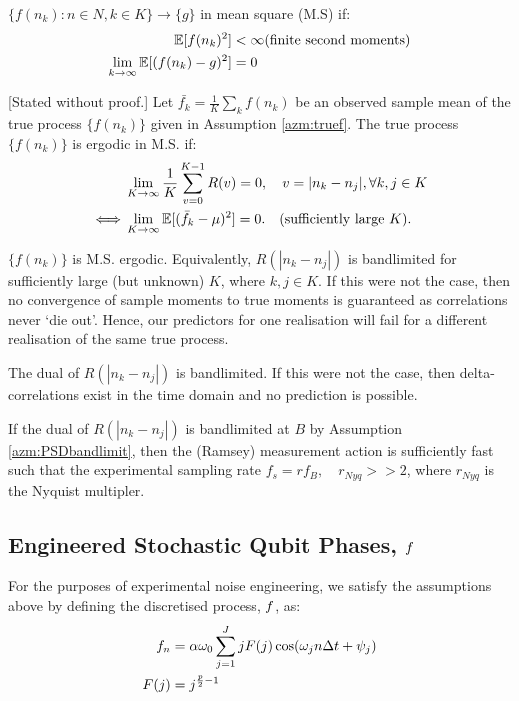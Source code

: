 \begin{defn} \label{dfn:ms} $\{f(n_k): n\in N, k \in K \} \rightarrow \{g\}$ in mean square (M.S) if:
	\begin{align}
	\mathbb{E}[f(n_k)^2] & < \infty \text{(finite second moments)} \\
	\lim_{k \rightarrow \infty}\mathbb{E}[(f(n_k) - g)^2] &= 0
	\end{align}
\end{defn}

\begin{thm} \label{thm:erogodic}
	[Stated without proof.] Let $\bar{f_k} = \frac{1}{K} \sum_k f(n_k)$ be an observed sample mean of the true process $\{f(n_k)\}$ given in Assumption \ref{azm:truef}. The true process $\{f(n_k)\}$ is ergodic in M.S. if:
	\begin{align}
	&\lim_{K \to \infty} \frac{1}{K} \sum_{v=0}^{K-1} R(v) = 0, \quad v = |n_k - n_j|, \forall k,j \in K \\
	\iff &\lim_{K \to \infty} \mathbb{E}[(\bar{f}_k - \mu)^2] = 0.\quad \text{(sufficiently large $K$)}.
	\end{align}
\end{thm}

\begin{azm} \label{azm:Rbandlimit}
	$\{f(n_k)\}$ is M.S. ergodic. Equivalently, $R(|n_k - n_j|)$ is bandlimited for sufficiently large (but unknown) $K$, where $k,j \in K$. If this were not the case, then no convergence of sample moments to true moments is guaranteed as correlations never `die out'. Hence, our predictors for one realisation will fail for a different realisation of the same true process. 
\end{azm}

\begin{azm}\label{azm:PSDbandlimit}
	The dual of $R(|n_k - n_j|)$ is bandlimited. If this were not the case, then delta-correlations exist in the time domain and no prediction is possible. 
\end{azm}

\begin{azm}\label{azm:fastmsmtaction}
	If the dual of $R(|n_k - n_j|)$ is bandlimited at $B$ by Assumption \ref{azm:PSDbandlimit}, then the (Ramsey) measurement action is sufficiently fast such that the experimental sampling rate $f_s = rf_B, \quad r_{Nyq} >> 2$, where $r_{Nyq} $ is the Nyquist multipler.
\end{azm}

\subsection{Engineered Stochastic Qubit Phases, $f$}
For the purposes of experimental noise engineering, we satisfy the assumptions above by defining the discretised process, $f$, as:
\begin{align}
f_n &= \alpha \omega_0 \sum_{j=1}^{J} j F(j)\cos(\omega_j n \Delta t + \psi_j) \label{eqn:app:noiseengineering} \\
F(j) & = j^{\frac{p}{2}-1} 
\end{align}

